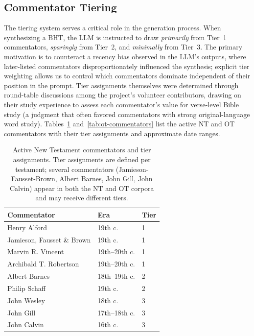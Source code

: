 \subsection{Commentator Tiering}

The tiering system serves a critical role in the generation process. When synthesizing a BHT, the LLM is instructed to draw \textit{primarily} from Tier~1 commentators, \textit{sparingly} from Tier~2, and \textit{minimally} from Tier~3. The primary motivation is to counteract a recency bias observed in the LLM's outputs, where later-listed commentators disproportionately influenced the synthesis; explicit tier weighting allows us to control which commentators dominate independent of their position in the prompt. Tier assignments themselves were determined through round-table discussions among the project's volunteer contributors, drawing on their study experience to assess each commentator's value for verse-level Bible study (a judgment that often favored commentators with strong original-language word study). Tables~\ref{tab:nt-commentators} and~\ref{tab:ot-commentators} list the active NT and OT commentators with their tier assignments and approximate date ranges.

\begin{table}[htbp]
\centering
\small
\caption{Active New Testament commentators and tier assignments. Tier assignments are defined per testament; several commentators (Jamieson-Fausset-Brown, Albert Barnes, John Gill, John Calvin) appear in both the NT and OT corpora and may receive different tiers.}
\label{tab:nt-commentators}
\begin{tabular}{@{}lll@{}}
\toprule
\textbf{Commentator} & \textbf{Era} & \textbf{Tier} \\
\midrule
Henry Alford & 19th c. & 1 \\
Jamieson, Fausset \& Brown & 19th c. & 1 \\
Marvin R. Vincent & 19th--20th c. & 1 \\
Archibald T. Robertson & 19th--20th c. & 1 \\
Albert Barnes & 18th--19th c. & 2 \\
Philip Schaff & 19th c. & 2 \\
John Wesley & 18th c. & 3 \\
John Gill & 17th--18th c. & 3 \\
John Calvin & 16th c. & 3 \\
\bottomrule
\end{tabular}
\end{table}


